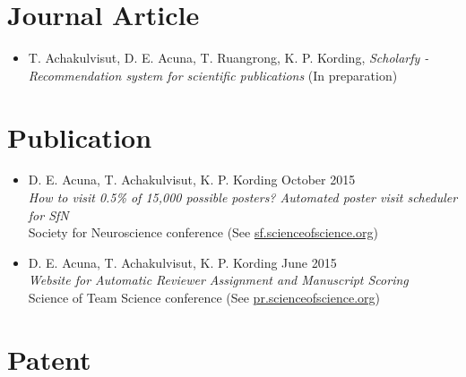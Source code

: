 \documentclass[margin,line]{res}
\begin{document}
\begin{resume}
\begin{itemize}[leftmargin=0cm, label={}]
\end{itemize}



\section{\sc Journal Article}

\begin{itemize}[leftmargin=0cm, label={}]

\item T. Achakulvisut, D. E. Acuna, T. Ruangrong, K. P. Kording, {\em Scholarfy - Recommendation system for scientific publications } (In preparation)

\end{itemize}



\section{\sc Publication}

\begin{itemize}[leftmargin=0cm, label={}]


\item D. E. Acuna, T. Achakulvisut, K. P. Kording			\hfill October 2015\\
{\em How to visit 0.5\% of 15,000 possible posters? Automated poster visit scheduler for SfN}\\
Society for Neuroscience conference (See \href{http://sf.scienceofscience.org/}{sf.scienceofscience.org})

\item D. E. Acuna, T. Achakulvisut, K. P. Kording 			\hfill June 2015\\
{\em Website for Automatic Reviewer Assignment and Manuscript Scoring}\\
Science of Team Science conference (See \href{http://pr.scienceofscience.org/}{pr.scienceofscience.org})

\end{itemize}


\section{\sc Patent}

\begin{itemize}[leftmargin=0cm, label={}]



\end{itemize}
\end{resume}
\end{document}
